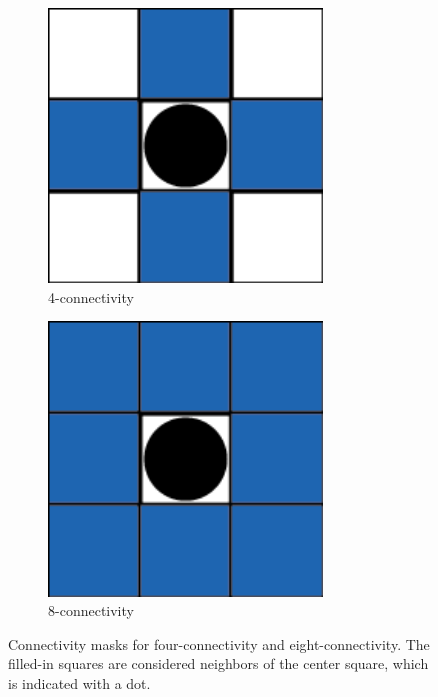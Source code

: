 \begin{figure}
	\centering
	\begin{subfigure}{0.45\columnwidth}
		\centering
		\includegraphics[width=0.8\textwidth]{./img/exp_mask_four}
		\caption{4-connectivity}
		\label{fig:exp:connectivity:fourMask}
	\end{subfigure}
	\begin{subfigure}{0.45\columnwidth}
		\centering
		\includegraphics[width=0.8\textwidth]{./img/exp_mask_eight}
		\caption{8-connectivity}
		\label{fig:exp:connectivity:eightMask}
	\end{subfigure}	
	\caption{Connectivity masks for  four-connectivity and  eight-connectivity. The filled-in squares are considered neighbors of the center square, which is indicated with a dot.}
	\label{fig:exp:connectivity}
\end{figure}
